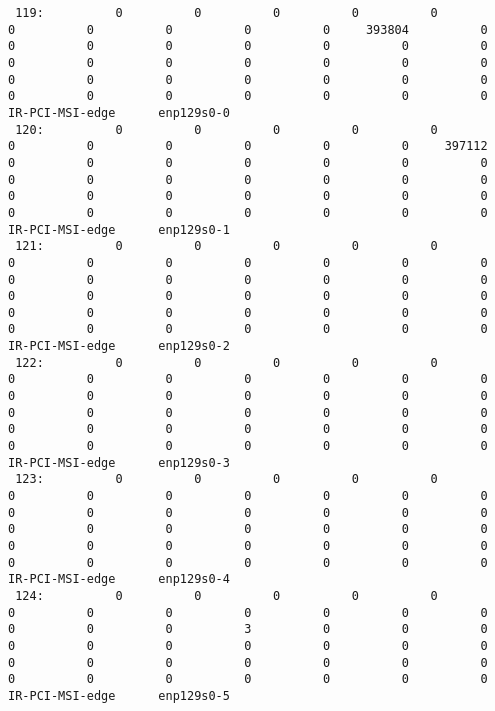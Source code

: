 \begin{lstlisting}
 119:          0          0          0          0          0          0          0          0          0          0     393804          0          0          0          0          0          0          0          0          0          0          0          0          0          0          0          0          0          0          0          0          0          0          0          0          0          0          0          0          0  IR-PCI-MSI-edge      enp129s0-0
 120:          0          0          0          0          0          0          0          0          0          0          0     397112          0          0          0          0          0          0          0          0          0          0          0          0          0          0          0          0          0          0          0          0          0          0          0          0          0          0          0          0  IR-PCI-MSI-edge      enp129s0-1
 121:          0          0          0          0          0          0          0          0          0          0          0          0          0          0          0          0          0          0          0          0          0          0          0          0          0          0          0          0          0          0          0          0          0          0          0          0          0          0          0          0  IR-PCI-MSI-edge      enp129s0-2
 122:          0          0          0          0          0          0          0          0          0          0          0          0          0          0          0          0          0          0          0          0          0          0          0          0          0          0          0          0          0          0          0          0          0          0          0          0          0          0          0          0  IR-PCI-MSI-edge      enp129s0-3
 123:          0          0          0          0          0          0          0          0          0          0          0          0          0          0          0          0          0          0          0          0          0          0          0          0          0          0          0          0          0          0          0          0          0          0          0          0          0          0          0          0  IR-PCI-MSI-edge      enp129s0-4
 124:          0          0          0          0          0          0          0          0          0          0          0          0          0          0          0          3          0          0          0          0          0          0          0          0          0          0          0          0          0          0          0          0          0          0          0          0          0          0          0          0  IR-PCI-MSI-edge      enp129s0-5

\end{lstlisting}
